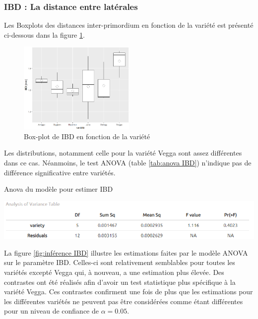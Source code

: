 \subsubsection{IBD : La distance entre latérales}

Les Boxplots des distances inter-primordium en fonction de la variété est présenté ci-dessous dans la figure \ref{fig:boxplot IBD}.

\begin{figure}[ht]
\centering
\includegraphics[width=0.5\textwidth]{Image/boxplot IBD.png}
\caption{Box-plot de IBD en fonction de la variété}
\label{fig:boxplot IBD}
\end{figure}

Les distributions, notamment celle pour la variété Vegga sont assez différentes dans ce cas.
Néanmoins, le test ANOVA (table \ref{tab:anova IBD}) n'indique pas de différence significative entre variétés.

\begin{table}[ht]
    \centering
    \caption{Anova du modèle pour estimer IBD}
    \includegraphics[width=1\textwidth]{Image/anova IBD.png}
    \label{tab:anova IBD}
\end{table}

La figure \ref{fig:inférence IBD} illustre les estimations faites par le modèle ANOVA sur le paramètre IBD.
Celles-ci sont relativement semblables pour toutes les variétés excepté Vegga qui, à nouveau, a une estimation plus élevée.
Des contrastes ont été réalisés afin d'avoir un test statistique plus spécifique à la variété Vegga.
Ces contrastes confirment une fois de plus que les estimations pour les différentes variétés ne peuvent pas être considérées comme étant différentes pour un niveau de confiance de $\alpha = 0.05$.

